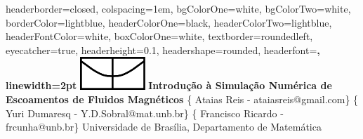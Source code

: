 \documentclass[portrait,a0paper,fontscale=0.40]{baposter} %
\begin{document}
\begin{poster}
{
headerborder=closed, %
colspacing=1em, %
bgColorOne=white, %
bgColorTwo=white, %
borderColor=lightblue, %
headerColorOne=black, %
headerColorTwo=lightblue, %
headerFontColor=white, %
boxColorOne=white, %
textborder=roundedleft, %
eyecatcher=true, %
headerheight=0.1\textheight, %
headershape=rounded, %
headerfont=\Large\bf\textsc, %
linewidth=2pt %
}
%
{\includegraphics[height=3.3em]{unbblack.jpg}} %
{\bf{Introdução à Simulação Numérica de Escoamentos de Fluidos Magnéticos}\vspace{0.5em}} %
{{\{ Ataias Reis - ataiasreis@gmail.com\} \{ Yuri Dumaresq - Y.D.Sobral@mat.unb.br\} \{ Francisco Ricardo - frcunha@unb.br\} \hspace{12pt} Universidade de Brasília, Departamento de Matemática}} %





\end{poster}
\end{document}
